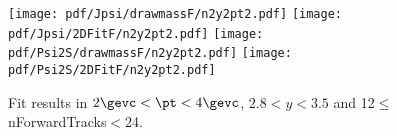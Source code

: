 \begin{figure}[H]
\begin{center}
\texttt{[image: pdf/Jpsi/drawmassF/n2y2pt2.pdf]}
\texttt{[image: pdf/Jpsi/2DFitF/n2y2pt2.pdf]}
\vspace*{-0.5cm}
\texttt{[image: pdf/Psi2S/drawmassF/n2y2pt2.pdf]}
\texttt{[image: pdf/Psi2S/2DFitF/n2y2pt2.pdf]}
\vspace*{-0.5cm}
\end{center}
\caption{Fit results in $2\gevc<\pt<4\gevc$, $2.8<y<3.5$ and 12$\leq$nForwardTracks$<$24.}
\label{Fitn2y2pt2}
\end{figure}
